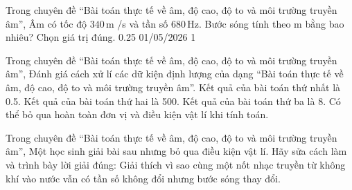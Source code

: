 \begin{ex}
Trong chuyên đề “Bài toán thực tế về âm, độ cao, độ to và môi trường truyền âm”, Âm có tốc độ $340\,\text{m}$ /s và tần số $680\,\text{Hz}$. Bước sóng tính theo m bằng bao nhiêu? Chọn giá trị đúng.
\choice
{0.25}
{01/05/2026}
{}
{1}
\end{ex}

\begin{ex}
Trong chuyên đề “Bài toán thực tế về âm, độ cao, độ to và môi trường truyền âm”, Đánh giá cách xử lí các dữ kiện định lượng của dạng “Bài toán thực tế về âm, độ cao, độ to và môi trường truyền âm”.
\choiceTF
{\True Kết quả của bài toán thứ nhất là 0.5.}
{\True Kết quả của bài toán thứ hai là 500.}
{\True Kết quả của bài toán thứ ba là 8.}
{Có thể bỏ qua hoàn toàn đơn vị và điều kiện vật lí khi tính toán.}
\end{ex}

\begin{ex}
Trong chuyên đề “Bài toán thực tế về âm, độ cao, độ to và môi trường truyền âm”, Một học sinh giải bài sau nhưng bỏ qua điều kiện vật lí. Hãy sửa cách làm và trình bày lời giải đúng: Giải thích vì sao cùng một nốt nhạc truyền từ không khí vào nước vẫn có tần số không đổi nhưng bước sóng thay đổi.
\choiceTF

\end{ex}

